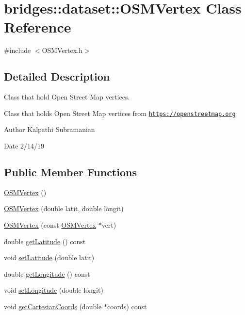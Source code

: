 \hypertarget{classbridges_1_1dataset_1_1_o_s_m_vertex}{}\section{bridges\+:\+:dataset\+:\+:O\+S\+M\+Vertex Class Reference}
\label{classbridges_1_1dataset_1_1_o_s_m_vertex}


{\ttfamily \#include $<$O\+S\+M\+Vertex.\+h$>$}



\subsection{Detailed Description}
Class that hold Open Street Map vertices. 

Class that holds Open Street Map vertices from \href{https://openstreetmap.org}{\tt https\+://openstreetmap.\+org}

\begin{DoxyAuthor}{Author}
Kalpathi Subramanian 
\end{DoxyAuthor}
\begin{DoxyDate}{Date}
2/14/19 
\end{DoxyDate}
\subsection*{Public Member Functions}
\begin{DoxyCompactItemize}
\item 
\mbox{\hyperlink{classbridges_1_1dataset_1_1_o_s_m_vertex_aa5d6ef7aef3bb762665aa6ab3a2658f6}{O\+S\+M\+Vertex}} ()
\item 
\mbox{\hyperlink{classbridges_1_1dataset_1_1_o_s_m_vertex_adb462cf123d9fcfa31f98096650456b8}{O\+S\+M\+Vertex}} (double latit, double longit)
\item 
\mbox{\hyperlink{classbridges_1_1dataset_1_1_o_s_m_vertex_a0459f92f161c9e1d465c5142b947a704}{O\+S\+M\+Vertex}} (const \mbox{\hyperlink{classbridges_1_1dataset_1_1_o_s_m_vertex}{O\+S\+M\+Vertex}} $\ast$vert)
\item 
double \mbox{\hyperlink{classbridges_1_1dataset_1_1_o_s_m_vertex_a1f41a5f01d68747ee04b5c5eaa629c6e}{get\+Latitude}} () const
\item 
void \mbox{\hyperlink{classbridges_1_1dataset_1_1_o_s_m_vertex_af4ab2d69122919f504b78bd9540ccaa1}{set\+Latitude}} (double latit)
\item 
double \mbox{\hyperlink{classbridges_1_1dataset_1_1_o_s_m_vertex_a98e17875d886a63ed73a6f77cc26686d}{get\+Longitude}} () const
\item 
void \mbox{\hyperlink{classbridges_1_1dataset_1_1_o_s_m_vertex_a48e077133233ba705342ba955c6fdc23}{set\+Longitude}} (double longit)
\item 
void \mbox{\hyperlink{classbridges_1_1dataset_1_1_o_s_m_vertex_a0151ea438e8265b184a91c9591aa8a12}{get\+Cartesian\+Coords}} (double $\ast$coords) const
\end{DoxyCompactItemize}


